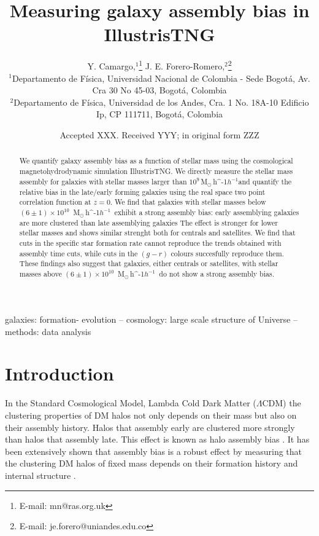 \documentclass[fleqn,usenatbib]{mnras}
\title[Galaxy Assembly Bias]{Measuring galaxy assembly bias in IllustrisTNG}
\author[Camargo, Y. \& Forero-Romero J. E.]{
Y. Camargo,$^{1}$\thanks{E-mail: mn@ras.org.uk}
J. E. Forero-Romero,$^{2}$\thanks{E-mail: je.forero@uniandes.edu.co}
\\
$^{1}$Departamento de F\'isica, Universidad Nacional de Colombia - Sede Bogot\'a, Av. Cra 30 No 45-03, Bogot\'a, Colombia\\
$^{2}$Departamento de F\'isica, Universidad de los Andes, Cra. 1 No. 18A-10 Edificio Ip, CP 111711, Bogot\'a, Colombia\\
}
\date{Accepted XXX. Received YYY; in original form ZZZ}
\newcommand{\Msunh}{\,{\rm M}$_{\odot}$\,\ifmmode h^{-1}\else $h^{-1}$\fi}
\begin{document}
\label{firstpage}
\pagerange{\pageref{firstpage}--\pageref{lastpage}}
\maketitle

\begin{abstract}
We quantify galaxy assembly bias as a function of
stellar mass using the cosmological magnetohydrodynamic simulation
IllustrisTNG.
We directly measure the stellar mass assembly for galaxies with
stellar masses larger than $10^{9}$\Msunh and quantify the relative
bias in the late/early forming galaxies  using the real space two
point correlation function at $z=0$. 
We find that galaxies with stellar masses below $(6\pm 1)\times
10^{10}$ \Msunh\ exhibit a strong assembly bias: early
assemblying galaxies are more clustered than late assemblying galaxies
The effect is stronger for lower stellar masses and shows similar
strenght both for centrals and satellites. 
We find that cuts in the specific star formation rate cannot reproduce
the trends obtained with assembly time cuts, while cuts in the $(g-r)$
colours succesfully reproduce them.
These findings also suggest that galaxies, either centrals or
satellites, with stellar masses above $(6\pm 1)\times 10^{10}$
\Msunh\ do not show a strong assembly bias.    
\end{abstract}

\begin{keywords}
galaxies: formation- evolution -- cosmology: large scale structure of Universe -- methods: data analysis
\end{keywords}



\section{Introduction}
In the Standard Cosmological Model, Lambda Cold Dark Matter
($\Lambda$CDM) the clustering properties of DM halos not only depends on their mass
but also on their assembly history.
Halos that assembly early are clustered more strongly
than halos that assembly late.
This effect is known as halo assembly bias \citep{2005MNRAS.363L..66G}.
It has been extensively shown  that
assembly bias is a robust effect
by measuring that the clustering DM halos of fixed mass depends on their formation history and internal structure \citep{2006ApJ...652...71W,2008ApJ...687...12D}.
\end{document}
